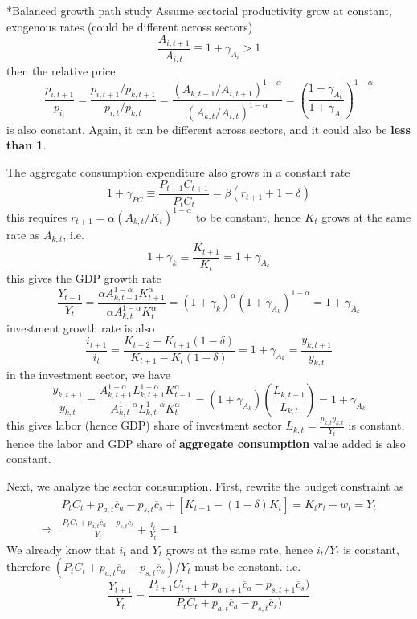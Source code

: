 \documentclass[10pt,landscape,a4paper]{article}
\makeatletter
\let\bar\overline
\renewcommand{\subsection}{\@startsection{subsection}{1}{0mm}{.2ex}{.2ex}{\small\bfseries}}
\makeatother
\begin{document}
\begin{multicols*}{3}
\subsection*{Balanced growth path study}
Assume sectorial productivity grow at constant, exogenous rates (could be different across sectors)
$$
\frac{A_{i,t+1}}{A_{i,t}}\equiv  1+\gamma_{A_i}>1
$$
then the relative price
$$
\frac{p_{i,t+1}}{p_{i_t}}=\frac{p_{i,t+1}/p_{k,t+1}}{p_{i,t}/p_{k,t}} = \frac{\left(A_{k,t+1}/A_{i,t+1}\right)^{1-\alpha}}{\left(A_{k,t}/A_{i,t}\right)^{1-\alpha}} = \left(\frac{1+\gamma_{A_k}}{1+\gamma_{A_i}}\right)^{1-\alpha}
$$
is also constant. Again, it can be different across sectors, and it could also be \textbf{less than 1}.

The aggregate consumption expenditure also grows in a constant rate
$$
1+\gamma_{PC}\equiv \frac{P_{t+1}C_{t+1}}{P_tC_t}=\beta(r_{t+1}+1-\delta)
$$
this requires $r_{t+1}=\alpha\left(A_{k,t}/K_t\right)^{1-\alpha}$ to be constant, hence $K_t$ grows at the same rate as $A_{k,t}$, i.e.
$$
1+\gamma_k\equiv \frac{K_{t+1}}{K_t}=1+
\gamma_{A_k}
$$
this gives the GDP growth rate
$$
\frac{Y_{t+1}}{Y_t}=\frac{\alpha A_{k,t+1}^{1-\alpha}K_{t+1}^{\alpha}}{\alpha A_{k,t}^{1-\alpha}K_t^{\alpha}} = (1+\gamma_k)^{\alpha}(1+\gamma_{A_k})^{1-\alpha}=1+\gamma_{A_k}
$$
investment growth rate is also
$$
\frac{i_{t+1}}{i_t} = \frac{K_{t+2}-K_{t+1}(1-\delta)}{K_{t+1}-K_t(1-\delta)} = 1+\gamma_{A_k} = \frac{y_{k,t+1}}{y_{k,t}}
$$
in the investment sector, we have
$$
\frac{y_{k,t+1}}{y_{k,t}}=\frac{A_{k,t+1}^{1-\alpha}L_{k,t+1}^{1-\alpha}K_{t+1}^{\alpha}}{A_{k,t}^{1-\alpha}L_{k,t}^{1-\alpha}K_t^{\alpha}} = (1+\gamma_{A_k})\left(\frac{L_{k,t+1}}{L_{k,t}}\right) = 1+\gamma_{A_k}
$$
this gives labor (hence GDP) share of investment sector $L_{k,t}=\frac{p_{k,t}y_{k,t}}{Y_t}$ is constant, hence the labor and GDP share of \textbf{aggregate consumption} value added is also constant.

Next, we analyze the sector consumption. First, rewrite the budget constraint as
\begin{align*}
    &P_tC_t +p_{a,t}\bar{c}_a -p_{s,t}\bar{c}_s+\left[K_{t+1}-(1-\delta)K_t\right]=K_tr_t +w_t=Y_t\\
    \Rightarrow & \frac{P_tC_t +p_{a,t}\bar{c}_a -p_{s,t}\bar{c}_s}{Y_t}+\frac{i_t}{Y_t}=1
\end{align*}
We already know that $i_t$ and $Y_t$ grows at the same rate, hence $i_t/Y_t$ is constant, therefore $(P_tC_t+p_{a,t}\bar{c}_a-p_{s,t}\bar{c}_s)/Y_t$ must be constant. i.e.
$$
\frac{Y_{t+1}}{Y_t}=\frac{P_{t+1}C_{t+1}+p_{a,t+1}\bar{c}_a-p_{s,t+1}\bar{c}_s)}{P_tC_t+p_{a,t}\bar{c}_a-p_{s,t}\bar{c}_s)}
$$


\end{multicols*}
\end{document}
